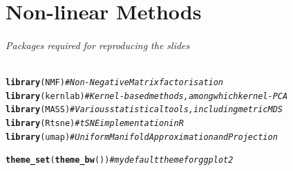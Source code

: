 \documentclass{beamer}\usepackage[]{graphicx}\usepackage[]{color}
\makeatletter
\newcommand{\hlcom}[1]{\textcolor[rgb]{0.678,0.584,0.686}{\textit{#1}}}%
\newcommand{\hlstd}[1]{\textcolor[rgb]{0.345,0.345,0.345}{#1}}%
\newcommand{\hlkwd}[1]{\textcolor[rgb]{0.737,0.353,0.396}{\textbf{#1}}}%
\newenvironment{kframe}{%
 \def\at@end@of@kframe{}%
 \ifinner\ifhmode%
  \def\at@end@of@kframe{\end{minipage}}%
  \begin{minipage}{\columnwidth}%
 \fi\fi%
 \def\FrameCommand##1{\hskip\@totalleftmargin \hskip-\fboxsep
 \colorbox{shadecolor}{##1}\hskip-\fboxsep
     \hskip-\linewidth \hskip-\@totalleftmargin \hskip\columnwidth}%
 \MakeFramed {\advance\hsize-\width
   \@totalleftmargin\z@ \linewidth\hsize
   \@setminipage}}%
 {\par\unskip\endMakeFramed%
 \at@end@of@kframe}
\newenvironment{knitrout}{}{} %
\makeatother
\begin{document}
\part{Non-linear Methods}
\begin{frame}[fragile]
  \partpage

\paragraph{Packages required for reproducing the slides}
\begin{knitrout}\scriptsize
{}\color{fgcolor}\begin{kframe}
\begin{alltt}
\hlkwd{library}\hlstd{(NMF)}        \hlcom{# Non-Negative Matrix factorisation}
\hlkwd{library}\hlstd{(kernlab)}    \hlcom{# Kernel-based methods, among which kernel-PCA}
\hlkwd{library}\hlstd{(MASS)}       \hlcom{# Various statistical tools, including metric MDS}
\hlkwd{library}\hlstd{(Rtsne)}      \hlcom{# tSNE implementation in R }
\hlkwd{library}\hlstd{(umap)}       \hlcom{# Uniform Manifold Approximation and Projection}

\hlkwd{theme_set}\hlstd{(}\hlkwd{theme_bw}\hlstd{())} \hlcom{# my default theme for ggplot2}
\end{alltt}
\end{kframe}
\end{knitrout}

\end{frame}

\end{document}
